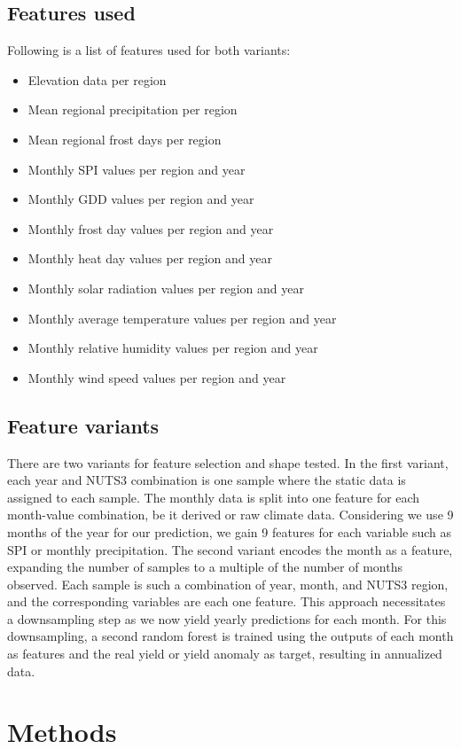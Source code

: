 \documentclass{article}
\begin{document}
\subsection{Features used}
Following is a list of features used for both variants:
\begin{itemize}
	\item Elevation data per region
	\item Mean regional precipitation per region
	\item Mean regional frost days per region
	\item Monthly SPI values per region and year
	\item Monthly GDD values per region and year
	\item Monthly frost day values per region and year
	\item Monthly heat day values per region and year
	\item Monthly solar radiation values per region and year
	\item Monthly average temperature values per region and year
	\item Monthly relative humidity values per region and year
	\item Monthly wind speed values per region and year
\end{itemize}
\subsection{Feature variants}
There are two variants for feature selection and shape tested.
In the first variant, each year and NUTS3 combination is one sample where the static data is assigned to each sample. The monthly data is split into one feature for each month-value combination, be it derived or raw climate data. Considering we use 9 months of the year for our prediction, we gain 9 features for each variable such as SPI or monthly precipitation.
The second variant encodes the month as a feature, expanding the number of samples to a multiple of the number of months observed. Each sample is such a combination of year, month, and NUTS3 region, and the corresponding variables are each one feature.
This approach necessitates a downsampling step as we now yield yearly predictions for each month. For this downsampling, a second random forest is trained using the outputs of each month as features and the real yield or yield anomaly as target, resulting in annualized data.
\section{Methods}
\end{document}
